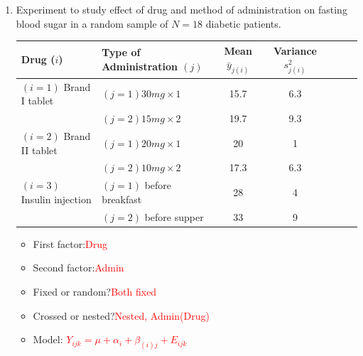 \begin{enumerate}
\item Experiment to study effect of drug and method of administration on fasting blood sugar in a random sample of $N=18$ diabetic patients.
\begin{large}
\begin{center}
\begin{tabular}{llccccc}
Drug ($i$) & Type of Administration $(j)$ & Mean $\bar{y}_{j(i)}$ & Variance $s_{j(i)}^2$ \\ \hline
$(i=1)$ Brand I tablet & $(j=1)30 mg \times 1$ & 15.7 & 6.3 \\
& $(j=2)15 mg \times 2$ & 19.7 & 9.3 \\
$(i=2)$ Brand II tablet & $(j=1)20 mg \times 1$ & 20 & 1 \\
& $(j=2)10 mg \times 2$ & 17.3 & 6.3 \\
$(i=3)$ Insulin injection & $(j=1)$ before breakfast  & 28  & 4 \\
& $(j=2)$ before supper & 33 & 9 \\ \hline
\end{tabular}
\end{center}
\end{large}

\begin{itemize}
\item First factor:\textcolor{red}{Drug}
\item Second factor:\textcolor{red}{Admin}
\item Fixed or random?\textcolor{red}{Both fixed}
\item Crossed or nested?\textcolor{red}{Nested, Admin(Drug)}
\item Model: %
\textcolor{red}{$Y_{ijk} = \mu + \alpha_i+\beta_{(i)j} + E_{ijk}$}
\end{itemize}


\end{enumerate}
